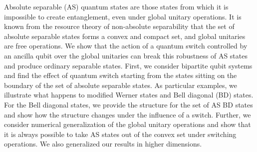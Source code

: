     Absolute separable (AS) quantum states are those states from which it is impossible to create entanglement, even under global unitary operations. It is known from the resource theory of non-absolute separability that the set of absolute separable states forms a convex and compact set, and global unitaries are free operations. We show that the action of a quantum switch controlled by an ancilla qubit over the global unitaries can break this robustness of AS states and produce ordinary separable states. First, we consider bipartite qubit systems and find the effect of quantum switch starting from the states sitting on the boundary of the set of absolute separable states. As particular examples, we illustrate what happens to modified Werner states and Bell diagonal (BD) states. For the Bell diagonal states, we provide the structure for the set of AS BD  states and show how the structure changes under the influence of a switch. Further, we consider numerical generalization of the global unitary operations and show that it is always possible to take AS states out of the convex set under switching operations. We also generalized our results in higher dimensions.